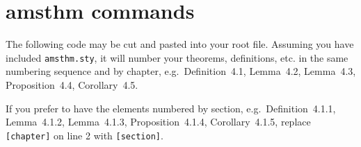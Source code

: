 
\chapter{amsthm commands}
\label{amsthmcommands}

The following code may be cut and pasted into your root file. Assuming you have included \verb"amsthm.sty", it will number your theorems, definitions, etc. in the same numbering sequence and by chapter, e.g.~Definition~4.1, Lemma~4.2, Lemma~4.3, Proposition~4.4, Corollary~4.5.

If you prefer to have the elements numbered by section, e.g.~Definition~4.1.1, Lemma~4.1.2, Lemma~4.1.3, Proposition~4.1.4, Corollary~4.1.5, replace \verb"[chapter]" on line 2 with \verb"[section]".

\begin{smallverbatim}

  \theoremstyle{plain}%
  \newtheorem{theorem}{Theorem}[chapter]
  \newtheorem{lemma}[theorem]{Lemma}
  \newtheorem{corollary}[theorem]{Corollary}
  \newtheorem{proposition}[theorem]{Proposition}
  \newtheorem{conjecture}[theorem]{Conjecture}
  \newtheorem{criterion}[theorem]{Criterion}
  \newtheorem{algorithm}[theorem]{Algorithm}

  \theoremstyle{definition}
  \newtheorem{definition}[theorem]{Definition}
  \newtheorem{condition}[theorem]{Condition}
  \newtheorem{problem}[theorem]{Problem}
  \newtheorem{example}[theorem]{Example}
  \newtheorem{exer}{Exercise}[section]

  \theoremstyle{remark}
  \newtheorem{remark}[theorem]{Remark}
  \newtheorem{note}[theorem]{Note}
  \newtheorem{notation}[theorem]{Notation}
  \newtheorem{claim}[theorem]{Claim}
  \newtheorem{summary}[theorem]{Summary}
  \newtheorem{acknowledgement}[theorem]{Acknowledgement}
  \newtheorem{case}[theorem]{Case}
  \newtheorem{conclusion}[theorem]{Conclusion}
\end{smallverbatim}

\endinput